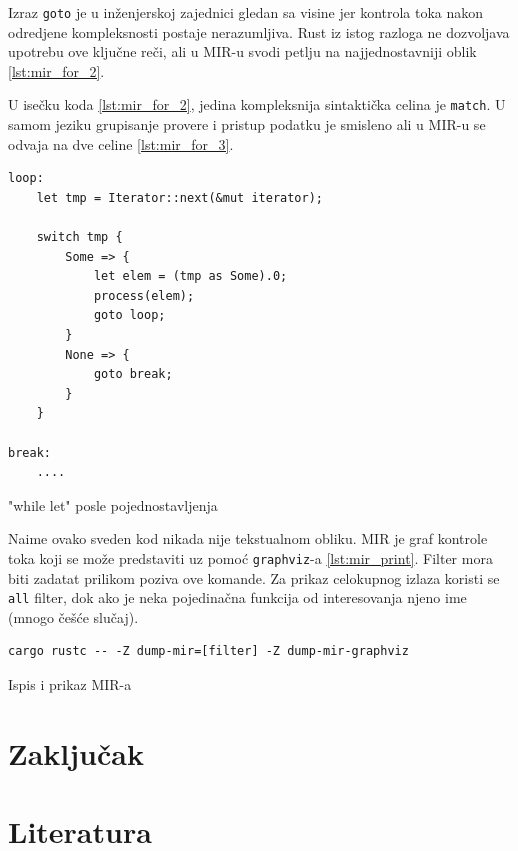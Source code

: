 \documentclass[11pt]{article}
\begin{document}
Izraz \verb|goto| je u inženjerskoj zajednici gledan sa visine jer kontrola toka nakon odredjene kompleksnosti
postaje nerazumljiva. Rust iz istog razloga ne dozvoljava upotrebu ove ključne reči, ali u MIR-u svodi 
petlju na najjednostavniji oblik \ref{lst:mir_for_2}.

\newpage
U isečku koda \ref{lst:mir_for_2}, jedina kompleksnija sintaktička celina je \verb|match|. U samom jeziku 
grupisanje provere i pristup podatku je smisleno ali u MIR-u se odvaja na dve celine \ref{lst:mir_for_3}.

\begin{listing}[H]
\begin{verbatim}
loop:
    let tmp = Iterator::next(&mut iterator);
    
    switch tmp {
        Some => {
            let elem = (tmp as Some).0;
            process(elem);
            goto loop;
        }
        None => {
            goto break;
        }
    }
    
break:
    ....
\end{verbatim}
\caption{"while let" posle pojednostavljenja}
\label{lst:mir_for_3}
\end{listing}

Naime ovako sveden kod nikada nije tekstualnom obliku. MIR je graf kontrole toka koji se može predstaviti
uz pomoć \verb|graphviz|-a \ref{lst:mir_print}. Filter mora biti zadatat prilikom poziva ove komande. 
Za prikaz celokupnog izlaza koristi se \verb|all| filter, dok ako je neka pojedinačna funkcija od interesovanja
njeno ime (mnogo češće slučaj).

\begin{listing}[H]
\begin{verbatim}
cargo rustc -- -Z dump-mir=[filter] -Z dump-mir-graphviz
\end{verbatim}
\caption{Ispis i prikaz MIR-a}
\label{lst:mir_print}
\end{listing}


\newpage
\section{Zaključak}

\newpage
\section{Literatura}
\end{document}
